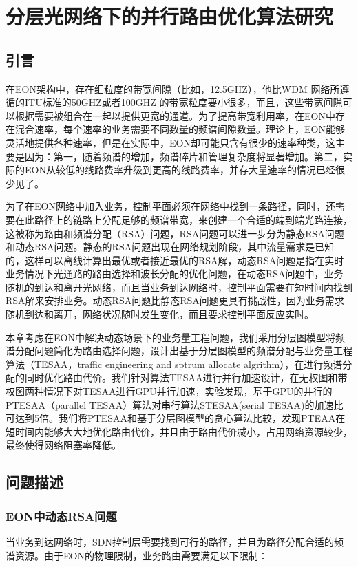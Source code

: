 
\chapter{分层光网络下的并行路由优化算法研究}
\section{引言}
在EON架构中，存在细粒度的带宽间隙（比如，12.5GHZ），他比WDM 网络所遵循的ITU标准的50GHZ或者100GHZ 的带宽粒度要小很多，而且，这些带宽间隙可以根据需要被组合在一起以提供更宽的通道。为了提高带宽利用率，在EON中存在混合速率，每个速率的业务需要不同数量的频谱间隙数量。理论上，EON能够灵活地提供各种速率，但是在实际中，EON却可能只含有很少的速率种类，这主要是因为：第一，随着频谱的增加，频谱碎片和管理复杂度将显著增加。第二，实际的EON从较低的线路费率升级到更高的线路费率，并存大量速率的情况已经很少见了。

为了在EON网络中加入业务，控制平面必须在网络中找到一条路径，同时，还需要在此路径上的链路上分配足够的频谱带宽，来创建一个合适的端到端光路连接，这被称为路由和频谱分配（RSA）问题，RSA问题可以进一步分为静态RSA问题和动态RSA问题。静态的RSA问题出现在网络规划阶段，其中流量需求是已知的，这样可以离线计算出最优或者接近最优的RSA解，动态RSA问题是指在实时业务情况下光通路的路由选择和波长分配的优化问题，在动态RSA问题中，业务随机的到达和离开光网络，而且当业务到达网络时，控制平面需要在短时间内找到RSA解来安排业务。动态RSA问题比静态RSA问题更具有挑战性，因为业务需求随机到达和离开，网络状况随时发生变化，而且要求控制平面反应实时。

本章考虑在EON中解决动态场景下的业务量工程问题，我们采用分层图模型将频谱分配问题简化为路由选择问题，设计出基于分层图模型的频谱分配与业务量工程算法（TESAA，traffic engineering and sptrum allocate algrithm），在进行频谱分配的同时优化路由代价。我们针对算法TESAA进行并行加速设计，在无权图和带权图两种情况下对TESAA进行GPU并行加速，实验发现，基于GPU的并行的PTESAA（parallel TESAA）算法对串行算法STESAA(serial TESAA)的加速比可达到5倍。我们将PTESAA和基于分层图模型的贪心算法比较，发现PTEAA在短时间内能够大大地优化路由代价，并且由于路由代价减小，占用网络资源较少，最终使得网络阻塞率降低。
\section{问题描述}
\subsection{EON中动态RSA问题}
当业务到达网络时，SDN控制层需要找到可行的路径，并且为路径分配合适的频谱资源。由于EON的物理限制，业务路由需要满足以下限制：

